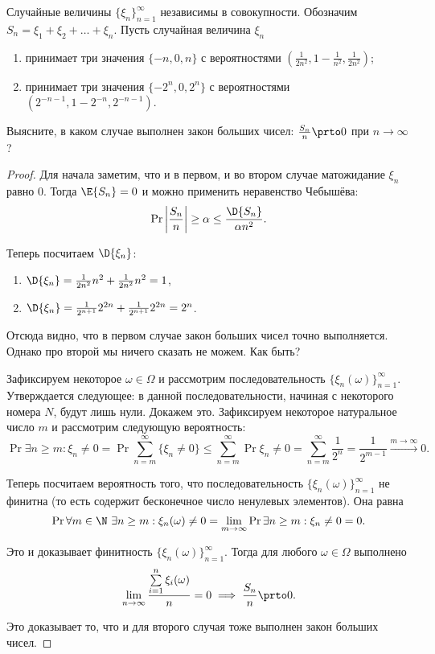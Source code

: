 \begin{problem}
    Случайные величины \(\{\xi_n\}_{n = 1}^{\infty}\) независимы в совокупности. Обозначим \(S_n = \xi_1 + \xi_2 + \ldots + \xi_n\). Пусть случайная величина \(\xi_n\)
    
    \begin{enumerate}
        \item принимает три значения \(\{-n, 0, n\}\) с вероятностями \(\left(\frac{1}{2n^2}, 1 - \frac{1}{n^2}, \frac{1}{2n^2}\right)\);
        \item принимает три значения \(\{-2^n, 0, 2^n\}\) с вероятностями \(\left(2^{-n - 1}, 1 - 2^{-n}, 2^{-n - 1}\right)\).
    \end{enumerate}

    Выясните, в каком случае выполнен закон больших чисел: \(\frac{S_{n}}{n} \prto 0\) при \(n\to \infty\)?
\end{problem}
\begin{proof}
    Для начала заметим, что и в первом, и во втором случае матожидание \(\xi_n\) равно 0. Тогда \(\E{S_n} = 0\) и можно применить неравенство Чебышёва:
    \[\Pr{\left|\frac{S_n}{n}\right| \geq \alpha} \leq \frac{\D{S_n}}{\alpha n^2}.\]
    
    Теперь посчитаем \(\D{\xi_n}\):
    \begin{enumerate}
        \item \(\D{\xi_n} = \frac{1}{2n^2}n^2 + \frac{1}{2n^2}n^2 = 1\),
        \item \(\D{\xi_n} = \frac{1}{2^{n + 1}}2^{2n} + \frac{1}{2^{n + 1}}2^{2n} = 2^n\).
    \end{enumerate}
    
    Отсюда видно, что в первом случае закон больших чисел точно выполняется. Однако про второй мы ничего сказать не можем. Как быть?
    
    Зафиксируем некоторое \(\omega \in \Omega\) и рассмотрим последовательность \(\{\xi_n(\omega)\}_{n = 1}^{\infty}\). Утверждается следующее: в данной последовательности, начиная с некоторого номера \(N\), будут лишь нули. Докажем это. Зафиксируем некоторое натуральное число \(m\) и рассмотрим следующую вероятность:
    \[\Pr{\exists n \geq m : \xi_{n} \neq 0} = \Pr{\sum_{n = m}^{\infty} \{\xi_n \neq 0\}} \leq \sum_{n = m}^{\infty} \Pr{\xi_n \neq 0} = \sum_{n = m}^{\infty} \frac{1}{2^n} = \frac{1}{2^{m - 1}} \xrightarrow{m \to \infty} 0.\]
    
    Теперь посчитаем вероятность того, что последовательность \(\{\xi_n(\omega)\}_{n = 1}^{\infty}\) не финитна (то есть содержит бесконечное число ненулевых элементов). Она равна
    \[\Pr{\forall m \in \N\ \exists n \geq m : \xi_{n}(\omega) \neq 0} = \lim\limits_{m \to \infty} \Pr{\exists n \geq m : \xi_{n} \neq 0} = 0.\]
    
    Это и доказывает финитность \(\{\xi_n(\omega)\}_{n = 1}^{\infty}\). Тогда для любого \(\omega \in \Omega\) выполнено
    \[\lim\limits_{n \to \infty} \frac{\sum\limits_{i = 1}^{n} \xi_i(\omega)}{n} = 0 \implies \frac{S_n}{n} \prto 0.\]
    
    Это доказывает то, что и для второго случая тоже выполнен закон больших чисел.
\end{proof}

